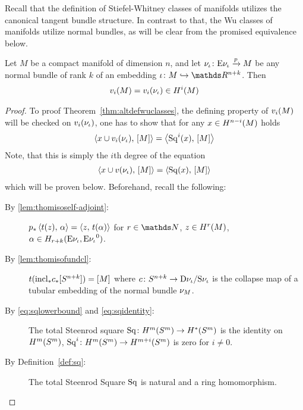 Recall that the definition of Stiefel-Whitney classes of manifolds
utilizes the canonical tangent bundle structure.
In contrast to that, the Wu classes of manifolds utilize normal
bundles, as will be clear from the promised equivalence below.
\begin{Thm}\label{thm:altdefwuclasses}
  Let $M$ be a compact manifold of dimension $n$, and let
  $\nu_{{\iota}}\colon \mathrm{E}\nu_{{\iota}} \xrightarrow{p} M$ be
  any normal bundle of rank $k$ of an embedding
  $\emb\colon M\immto\R^{n+k}$. Then
  \begin{gather*}
    {v_{i}}(M) = {v_{i}}(\nu_{{\iota}})\in H^i(M)
  \end{gather*}
  \begin{proof}
    To proof Theorem~\ref{thm:altdefwuclasses}, the defining property of
    ${v_{i}}(M)$ will be checked on ${v_{i}}(\nu_{{\iota}})$, \idest one has to show
    that for any $x\in H^{n-i}(M)$ holds
    \begin{gather*}
      \left\langle x\cup {v_{i}}(\nu_{{\iota}}),\, [M] \right\rangle
      = \left\langle \mathrm{Sq}^{i}(x),\, [M] \right\rangle
    \end{gather*}
    Note, that this is simply the $i$th degree of the equation
    \begin{gather}\label{eq:proofaltdefwuclasses:claim}
      \left\langle x\cup {v}(\nu_{{\iota}}),\, [M] \right\rangle
      = \left\langle \mathrm{Sq}(x),\, [M] \right\rangle
    \end{gather}
    which will be proven below.
    Beforehand, recall the following:
    \begin{description}
    \item[By \ref{lem:thomisoself-adjoint}:]
      ${p}_*\left\langle t(z),\, \alpha \right\rangle = \left\langle z,\, t(\alpha) \right\rangle$
      for $r\in\Nat$, $z\in H^r(M)$,
      $\alpha\in H_{r+k}(\mathrm{E}\nu_{{\iota}}, {\mathrm{E}\nu_{{\iota}}}^0)$.
    \item[By \ref{lem:thomisofundcl}:]
      $t({\mathrm{incl}}_*{c}_*[S^{n+k}]) = [M]$
      where $c\colon
      S^{n+k}\to\mathrm{D}\nu_{{\iota}}/\mathrm{S}\nu_{{\iota}}$ is
      the collapse map of a tubular embedding of the normal bundle
      $\nu_{M}$.
    \item[By \eqref{eq:sqlowerbound} and \eqref{eq:sqidentity}:]
      The total Steenrod square
      $\mathrm{Sq}\colon H^m(S^{m})
      \to H^*(S^{m})$
      is the identity on $H^m(S^{m})$, \idest
      $\mathrm{Sq}^{i}\colon H^m(S^{m})\to H^{m+i}(S^{m})$ is zero for
      $i\neq0$.
    \item[By Definition~\ref{def:sq}:] The total Steenrod Square
      $\mathrm{Sq}$ is natural and a ring homomorphism.

\end{description}
\end{proof}
\end{Thm}
